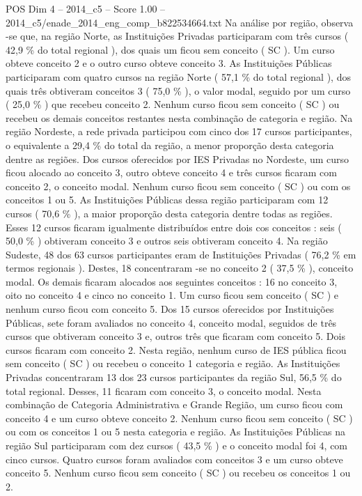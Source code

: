 \begin{textsample}{POS Dim 4 – 2014\_c5 – Score 1.00 – 2014\_c5/enade\_2014\_eng\_comp\_b822534664.txt}
Na análise por região, observa -se que, na região Norte, as Instituições Privadas participaram com três cursos ( 42,9 \% do total regional ), dos quais um ficou sem conceito ( SC ).
Um curso obteve conceito 2 e o outro curso obteve conceito 3.
As Instituições Públicas participaram com quatro cursos na região Norte ( 57,1 \% do total regional ), dos quais três obtiveram conceitos 3 ( 75,0 \% ), o valor modal, seguido por um curso ( 25,0 \% ) que recebeu conceito 2.
Nenhum curso ficou sem conceito ( SC ) ou recebeu os demais conceitos restantes nesta combinação de categoria e região.
Na região Nordeste, a rede privada participou com cinco dos 17 cursos participantes, o equivalente a 29,4 \% do total da região, a menor proporção desta categoria dentre as regiões.
Dos cursos oferecidos por IES Privadas no Nordeste, um curso ficou alocado ao conceito 3, outro obteve conceito 4 e três cursos ficaram com conceito 2, o conceito modal.
Nenhum curso ficou sem conceito ( SC ) ou com os conceitos 1 ou 5.
As Instituições Públicas dessa região participaram com 12 cursos ( 70,6 \% ), a maior proporção desta categoria dentre todas as regiões.
Esses 12 cursos ficaram igualmente distribuídos entre dois cos conceitos : seis ( 50,0 \% ) obtiveram conceito 3 e outros seis obtiveram conceito 4.
Na região Sudeste, 48 dos 63 cursos participantes eram de Instituições Privadas ( 76,2 \% em termos regionais ).
Destes, 18 concentraram -se no conceito 2 ( 37,5 \% ), conceito modal.
Os demais ficaram alocados aos seguintes conceitos : 16 no conceito 3, oito no conceito 4 e cinco no conceito 1.
Um curso ficou sem conceito ( SC ) e nenhum curso ficou com conceito 5.
Dos 15 cursos oferecidos por Instituições Públicas, sete foram avaliados no conceito 4, conceito modal, seguidos de três cursos que obtiveram conceito 3 e, outros três que ficaram com conceito 5.
Dois cursos ficaram com conceito 2.
Nesta região, nenhum curso de IES pública ficou sem conceito ( SC ) ou recebeu o conceito 1 categoria e região.
As Instituições Privadas concentraram 13 dos 23 cursos participantes da região Sul, 56,5 \% do total regional.
Desses, 11 ficaram com conceito 3, o conceito modal.
Nesta combinação de Categoria Administrativa e Grande Região, um curso ficou com conceito 4 e um curso obteve conceito 2.
Nenhum curso ficou sem conceito ( SC ) ou com os conceitos 1 ou 5 nesta categoria e região.
As Instituições Públicas na região Sul participaram com dez cursos ( 43,5 \% ) e o conceito modal foi 4, com cinco cursos.
Quatro cursos foram avaliados com conceitos 3 e um curso obteve conceito 5.
Nenhum curso ficou sem conceito ( SC ) ou recebeu os conceitos 1 ou 2.

\end{textsample}
